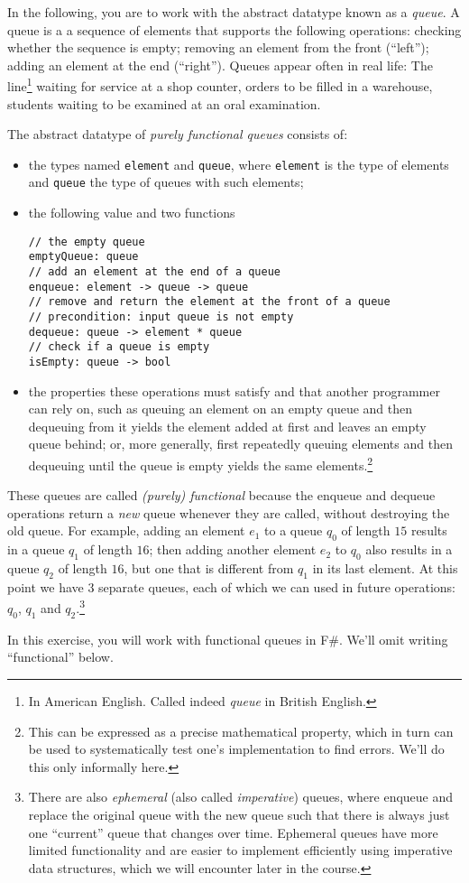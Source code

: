 In the following, you are to work with the abstract datatype known as a \emph{queue}. A queue is a
a sequence of elements that supports the following operations: checking whether the sequence is empty; removing an element from the front (``left''); adding an element at the end (``right'').  Queues appear often in real life: The line\footnote{In American English. Called indeed \emph{queue} in British English.} waiting for service at a shop counter, orders to be filled in a warehouse, students waiting to be examined at an oral examination. 

The abstract datatype of \emph{purely functional queues} consists of:
\begin{itemize}
\item the types named \texttt{element} and \texttt{queue}, where \texttt{element} is the type of elements and \texttt{queue} the type of queues with such elements;
\item the following value and two functions
\begin{lstlisting}
// the empty queue
emptyQueue: queue 
// add an element at the end of a queue
enqueue: element -> queue -> queue
// remove and return the element at the front of a queue
// precondition: input queue is not empty
dequeue: queue -> element * queue
// check if a queue is empty
isEmpty: queue -> bool
\end{lstlisting}
\item the properties these operations must satisfy and that another programmer can rely on, such as queuing an element on an empty queue and then dequeuing from it yields the element added at first and leaves an empty queue behind; or, more generally, first repeatedly queuing elements and then dequeuing until the queue is empty yields the same elements.\footnote{This can be expressed as a precise mathematical property, which in turn can be used to systematically test one's implementation to find errors.  We'll do this only informally here.}
\end{itemize}

These queues are called \emph{(purely) functional} because the enqueue and dequeue operations return a \emph{new} queue whenever they are called, without destroying the old queue. For example, adding an element $e_1$ to a queue $q_0$ of length $15$ results in a queue $q_1$ of length $16$; then adding another element $e_2$ to $q_0$ also results in a queue $q_2$ of length $16$, but one that is different from $q_1$ in its last element.  At this point we  have 3 separate queues, each of which we can used in future operations: $q_0$, $q_1$ and $q_2$.\footnote{There are also \emph{ephemeral} (also called \emph{imperative}) queues, where enqueue and replace the original queue with the new queue such that there is always just one ``current'' queue that changes over time.  Ephemeral queues have more limited functionality and are easier to implement efficiently using imperative data structures, which we will encounter later in the course.}

In this exercise, you will work with functional queues in F\#.  We'll omit writing ``functional'' below.